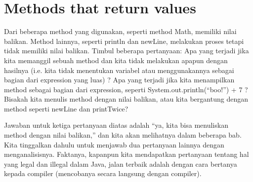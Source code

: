 \section{Methods that return values}
 Dari beberapa method yang digunakan, seperti method Math, memiliki nilai balikan. Method lainnya, seperti println dan newLine, melakukan proses tetapi tidak memiliki nilai balikan. Timbul beberapa pertanyaan:\newline \newline
\textbullet	Apa yang terjadi jika kita memanggil sebuah method dan kita tidak melakukan apapun dengan hasilnya (i.e. kita tidak menentukan variabel atau menggunakannya sebagai bagian dari expression yang luas) ?\newline \newline
\textbullet Apa yang terjadi jika kita menampilkan method sebagai bagian dari expression, seperti System.out.println(“boo!”) + 7 ?\newline \newline
\textbullet Bisakah kita menulis method dengan nilai balikan, atau kita bergantung dengan method seperti newLine dan printTwice?\newline

Jawaban untuk ketiga pertanyaan diatas adalah “ya, kita bisa menuliskan method dengan nilai balikan,” dan kita akan melihatnya dalam beberapa bab. Kita tinggalkan dahulu untuk menjawab dua pertanyaan lainnya dengan menganalisisnya. Faktanya, kapanpun kita mendapatkan pertanyaan tentang hal yang legal dan illegal dalam Java, jalan terbaik adalah dengan cara bertanya kepada compiler (mencobanya secara langsung dengan compiler).

